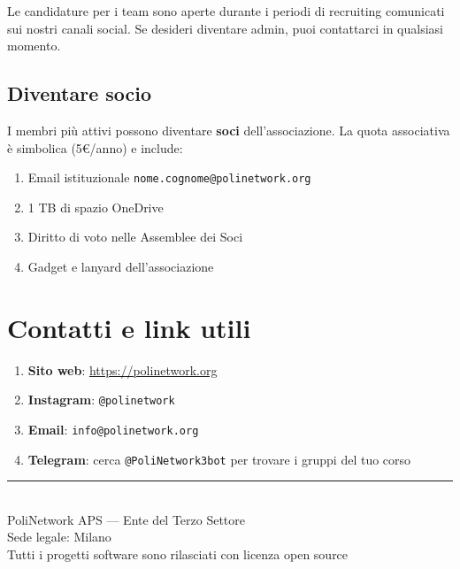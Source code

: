 \documentclass[letter]{core/polinetwork}
\begin{document}
Le candidature per i team sono aperte durante i periodi di
recruiting comunicati sui nostri canali social. Se desideri
diventare admin, puoi contattarci in qualsiasi momento.

\subsection{Diventare socio}

I membri più attivi possono diventare \textbf{soci} dell'associazione.
La quota associativa è simbolica (5\euro{}/anno) e include:
\begin{enumerate}[leftmargin=2em]
    \item Email istituzionale \texttt{nome.cognome@polinetwork.org}
    \item 1 TB di spazio OneDrive
    \item Diritto di voto nelle Assemblee dei Soci
    \item Gadget e lanyard dell'associazione
\end{enumerate}

\section{Contatti e link utili}

\begin{enumerate}[leftmargin=2em]
    \item \textbf{Sito web}: \url{https://polinetwork.org}
    \item \textbf{Instagram}: \texttt{@polinetwork}
    \item \textbf{Email}: \texttt{info@polinetwork.org}
    \item \textbf{Telegram}: cerca \texttt{@PoliNetwork3bot} per
          trovare i gruppi del tuo corso
\end{enumerate}

\vspace{2em}

\begin{center}
    \rule{0.3\textwidth}{0.5pt}\\[1em]
    \textcolor{pn-text-secondary}{\small PoliNetwork APS — Ente del Terzo Settore}\\
    \textcolor{pn-text-secondary}{\small Sede legale: Milano}\\
    \textcolor{pn-text-secondary}{\small Tutti i progetti software sono rilasciati con licenza open source}
\end{center}
\end{document}
